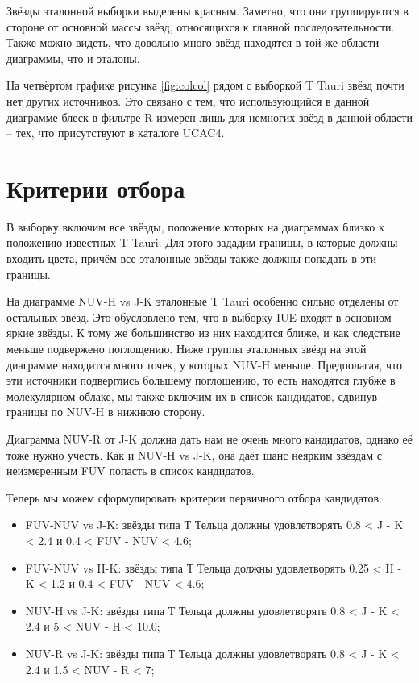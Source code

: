 Звёзды эталонной выборки выделены красным. Заметно, что они группируются в стороне от основной массы звёзд, относящихся к главной последовательности. Также можно видеть, что довольно много звёзд находятся в той же области диаграммы, что и эталоны.

На четвёртом графике рисунка \ref{fig:colcol} рядом с выборкой T Tauri звёзд почти нет других источников. Это связано с тем, что использующийся в данной диаграмме блеск в фильтре R измерен лишь для немногих звёзд в данной области -- тех, что присутствуют в каталоге UCAC4. 

\section{Критерии отбора}

В выборку включим все звёзды, положение которых на диаграммах близко к положению известных T Tauri. Для этого зададим границы, в которые должны входить цвета, причём все эталонные звёзды также должны попадать в эти границы.

На диаграмме NUV-H vs J-K эталонные T Tauri особенно сильно отделены от остальных звёзд. Это обусловлено тем, что в выборку IUE входят в основном яркие звёзды. К тому же большинство из них находится ближе, и как следствие меньше подвержено поглощению. Ниже группы эталонных звёзд на этой диаграмме находится много точек, у которых NUV-H меньше. Предполагая, что эти источники подверглись большему поглощению, то есть находятся глубже в молекулярном облаке, мы также включим их в список кандидатов, сдвинув границы по NUV-H в нижнюю сторону.

Диаграмма NUV-R от J-K должна дать нам не очень много кандидатов, однако её тоже нужно учесть. Как и NUV-H vs J-K, она даёт шанс неярким звёздам с неизмеренным FUV попасть в список кандидатов.

Теперь мы можем сформулировать критерии первичного отбора кандидатов:
\begin{itemize}
	\item FUV-NUV vs J-K: звёзды типа Т Тельца должны удовлетворять 0.8 < J - K < 2.4 и 0.4 < FUV - NUV < 4.6;
	\item	FUV-NUV vs H-K: звёзды типа Т Тельца должны удовлетворять 0.25 < H - K < 1.2 и 0.4 < FUV - NUV < 4.6;
	\item	NUV-H vs J-K: звёзды типа Т Тельца должны удовлетворять 0.8 < J - K < 2.4 и 5 < NUV - H < 10.0;
	\item	NUV-R vs J-K: звёзды типа Т Тельца должны удовлетворять 0.8 < J - K < 2.4 и 1.5 < NUV - R < 7;
\end{itemize}

